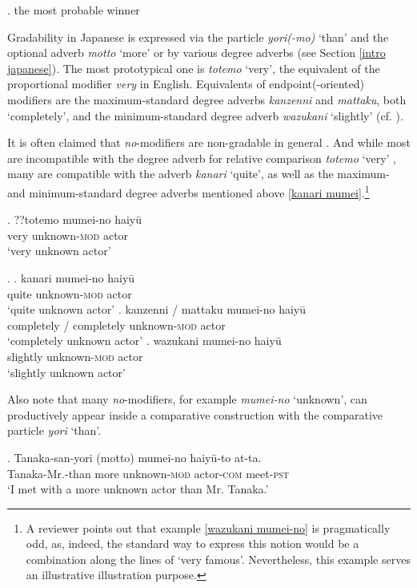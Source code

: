 \ex. the most probable winner \hfill \citep[47]{cinque:2010:adj}

Gradability in Japanese is expressed via the particle \textit{yori(-mo)} `than' and the optional adverb \textit{motto} `more' or by various degree adverbs (see Section \ref{intro japanese}). The most prototypical one is \textit{totemo} `very’, the equivalent of the proportional modifier \textit{very} in English. Equivalents of endpoint(-oriented) modifiers are the maximum-standard degree adverbs \textit{kanzenni} and \textit{mattaku}, both `completely’, and the minimum-standard degree adverb \textit{wazukani} `slightly’ (cf. \citealt{oshima:2019:gradability}).

\largerpage
It is often claimed that \textit{no}-modifiers are non-gradable in general \citep{kato:2003:nihongo, morita:2011:three, morita:2013:morph}. And while most are incompatible with the degree adverb for relative comparison \textit{totemo} `very’ , many are compatible with the adverb \textit{kanari} `quite’, as well as the maximum- and minimum-standard degree adverbs mentioned above \ref{kanari mumei}.\footnote{A reviewer points out that example \ref{wazukani mumei-no} is pragmatically odd, as, indeed, the standard way to express this notion would be a combination along the lines of `very famous'. Nevertheless, this example serves an illustrative illustration purpose.}

\exg. ??totemo mumei-no haiyū\\
very unknown-\textsc{mod} actor\\
`very unknown actor’ \label{totemo mumei}

\ex. \label{kanari mumei} \ag. kanari mumei-no haiyū\\
quite unknown-\textsc{mod} actor\\
`quite unknown actor'
\bg. kanzenni / mattaku mumei-no haiyū\\
completely / completely unknown-\textsc{mod} actor\\
`completely unknown actor'
\cg. wazukani mumei-no haiyū\\
slightly unknown-\textsc{mod} actor\\
`slightly unknown actor' \label{wazukani mumei-no}

Also note that many \textit{no}-modifiers, for example \textit{mumei-no} `unknown’, can productively appear inside a comparative construction with the comparative particle \textit{yori} `than’.

\exg. Tanaka-san-yori (motto) mumei-no haiyū-to at-ta.\\
Tanaka-Mr.-than more unknown-\textsc{mod} actor-\textsc{com} meet-\textsc{pst}\\
`I met with a more unknown actor than Mr. Tanaka.’

